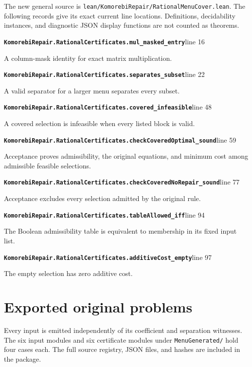 \documentclass[11pt,letterpaper,oneside,openany]{book}
\theoremstyle{quiet}
\newcommand{\record}[3]{\noindent\begin{minipage}{\linewidth}\small\textbf{\nolinkurl{#1}}\hfill\textsf{line #2}\par\smallskip #3\end{minipage}\par\vspace{7pt}}
\begin{document}
The new general source is \nolinkurl{lean/KomorebiRepair/RationalMenuCover.lean}. The following records give its exact current line locations. Definitions, decidability instances, and diagnostic JSON display functions are not counted as theorems.

\record{KomorebiRepair.RationalCertificates.mul_masked_entry}{16}{A column-mask identity for exact matrix multiplication.}
\record{KomorebiRepair.RationalCertificates.separates_subset}{22}{A valid separator for a larger menu separates every subset.}
\record{KomorebiRepair.RationalCertificates.covered_infeasible}{48}{A covered selection is infeasible when every listed block is valid.}
\record{KomorebiRepair.RationalCertificates.checkCoveredOptimal_sound}{59}{Acceptance proves admissibility, the original equations, and minimum cost among admissible feasible selections.}
\record{KomorebiRepair.RationalCertificates.checkCoveredNoRepair_sound}{77}{Acceptance excludes every selection admitted by the original rule.}
\record{KomorebiRepair.RationalCertificates.tableAllowed_iff}{94}{The Boolean admissibility table is equivalent to membership in its fixed input list.}
\record{KomorebiRepair.RationalCertificates.additiveCost_empty}{97}{The empty selection has zero additive cost.}

\section{Exported original problems}

Every input is emitted independently of its coefficient and separation witnesses. The six input modules and six certificate modules under \nolinkurl{MenuGenerated/} hold four cases each. The full source registry, JSON files, and hashes are included in the package.
\end{document}
